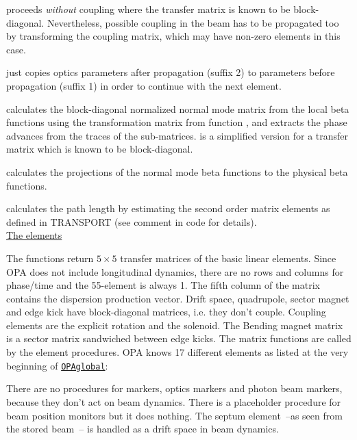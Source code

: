 \documentclass[12pt]{article}
\newcommand\code[1]{{\tt #1}}
\newcommand{\unico}[1]{{\color{burntorange}\code{#1}}}
\newcommand{\opauni}[1]{\colorbox{orange!30}{\code{#1}}}
\newcommand{\ouni}[1]{\hyperref[#1]{\opauni{#1}}}
\begin{document}
\unico{MBD\_prop} proceeds {\em without} coupling where the transfer matrix is known to be block-diagonal. Nevertheless, possible coupling in the beam has to be propagated too by transforming the coupling matrix, which may have non-zero elements in this case. 

\unico{PropForward} just copies optics parameters after propagation (suffix 2) to parameters before propagation (suffix 1) in order to continue with the next element.

\unico{PhaseAdvance} calculates the block-diagonal normalized normal mode matrix from the local beta functions using the transformation matrix from function \unico{CirMat}, and extracts the phase advances from the traces of the sub-matrices. \unico{getdTune} is a simplified version for a transfer matrix which is known to be block-diagonal.

\unico{GetBeta12} calculates the projections of the normal mode beta functions to the physical beta functions.

\unico{Pathlength} calculates the path length by estimating the second order matrix elements as defined in TRANSPORT (see comment in code for details).\\

\underline{The elements}

The \unico{\dots\_Matrix} functions return $5\times 5$ transfer matrices of the basic linear elements. Since OPA does not include longitudinal dynamics, there are no rows and columns for phase/time and the 55-element is always 1. The fifth column of the matrix contains the dispersion production vector. Drift space, quadrupole, sector magnet and edge kick have block-diagonal matrices, i.e. they don't couple. Coupling elements are the explicit rotation and the solenoid. The Bending magnet matrix is a sector matrix sandwiched between edge kicks. The matrix functions are called by the element procedures. 
OPA knows 17 different elements as listed at the very beginning of \ouni{OPAglobal}:

There are no procedures for markers, optics markers and photon beam markers, because they don't act on beam dynamics. There is a placeholder procedure \unico{Monitor} for beam position monitors but it does nothing. The septum element~--as seen from the stored beam~-- is handled as a drift space in beam dynamics.
\end{document}
